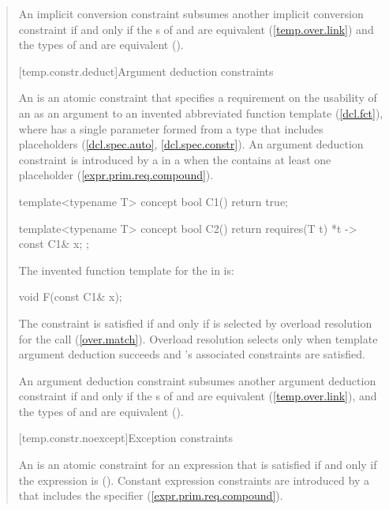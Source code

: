 \begin{quote}
\pnum
An implicit conversion constraint  subsumes another implicit 
conversion constraint  if and only if the s 
of  and  are equivalent (\ref{temp.over.link}) and the types
of  and  are equivalent ().


[temp.constr.deduct]{Argument deduction constraints}

\pnum
An  is an atomic
constraint that specifies a requirement on 
the usability of an  
 as an argument to an invented abbreviated
function template  (\ref{dcl.fct}),
where  has a single parameter formed from a type that 
includes placeholders 
(\ref{dcl.spec.auto}, \ref{dcl.spec.constr}).
% 
\enternote
An argument deduction constraint is introduced by a
 in a
 when the
contains at least one placeholder
(\ref{expr.prim.req.compound}).
\exitnote
% 
\enterexample
\begin{codeblock}
template<typename T>
concept bool C1() { return true; }

template<typename T>
concept bool C2() { return requires(T t) { {*t} -> const C1& x; }; }
\end{codeblock}
The invented function template for the
 in
 is:
\begin{codeblock}
void F(const C1& x);
\end{codeblock}
\exitexample
% 
The constraint is satisfied if and only if 
is selected by overload resolution for the call 
(\ref{over.match}).
% 
\enternote
Overload resolution selects  only when template 
argument deduction succeeds and 's associated 
constraints are satisfied.
\exitnote

\pnum
An argument deduction constraint  subsumes another argument deduction 
constraint  if and only if the s of
 and  are equivalent (\ref{temp.over.link}), and the types
of  and  are equivalent (). 


[temp.constr.noexcept]{Exception constraints}

\pnum
An  is an atomic constraint
for an expression  that is satisfied if and only
if the expression  is 
().
% 
\enternote
Constant expression constraints are introduced by a
 that
includes the  specifier
(\ref{expr.prim.req.compound}).
\exitnote



\end{quote}
